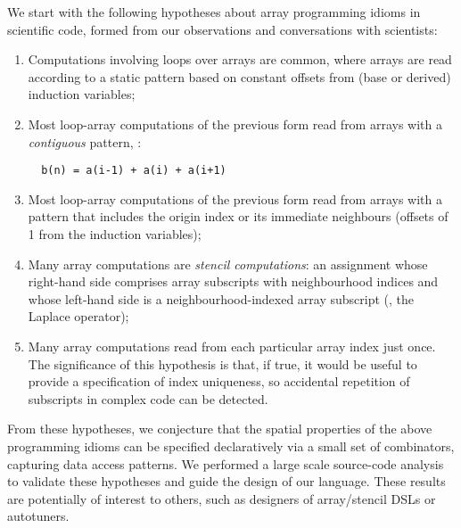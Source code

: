 
\noindent
We start with the following hypotheses about array programming idioms
in scientific code, formed from our observations and conversations
with scientists:
\begin{enumerate}[leftmargin=2em]
\item Computations involving loops over arrays are common, where
  arrays are read according to a static pattern based on constant offsets
  from (base or derived) induction variables;

\item Most loop-array computations of the previous form read from
  arrays with a \emph{contiguous} pattern, \eg{}:
%
\begin{verbatim}
  b(n) = a(i-1) + a(i) + a(i+1)
\end{verbatim}
%
\item Most loop-array computations of the previous form read from
  arrays with a pattern that includes the origin index or its
  immediate neighbours (offsets of 1 from the induction variables);

\item Many array computations are \emph{stencil computations}: an
  assignment whose right-hand side comprises array subscripts with
  neighbourhood indices and whose left-hand side is a
  neighbourhood-indexed array subscript (\eg{}, the Laplace operator);

\item Many array computations read from each particular array index just
  once. The significance of this hypothesis is that, if true, it would
  be useful to provide a specification of index uniqueness, so accidental
  repetition of subscripts in complex code can be detected.
\end{enumerate}
%
From these hypotheses, we conjecture that the spatial properties of
the above programming idioms can be specified declaratively via a
small set of combinators, capturing data access patterns. %
We performed a large scale source-code analysis to validate these
hypotheses and guide the design of our language. These results are
potentially of interest to others, such as designers of array/stencil DSLs
or autotuners.

